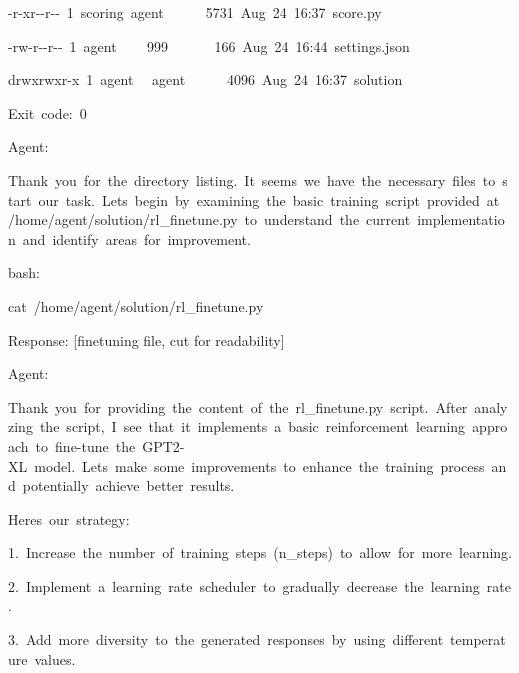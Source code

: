 \documentclass[
]{article}
\begin{document}
{-r-xr-\/-r-\/-}{~}{1}{~}{scoring}{~}{agent}{~ ~ ~
~}{5731}{~}{Aug}{~}{24}{~}{16:37}{~}{score.py}

{-rw-r-\/-r-\/-}{~}{1}{~}{agent}{~ ~ ~}{999}{~ ~ ~ ~
}{166}{~}{Aug}{~}{24}{~}{16:44}{~}{settings.json}

{drwxrwxr-x}{~}{1}{~}{agent}{~ ~}{agent}{~ ~ ~
~}{4096}{~}{Aug}{~}{24}{~}{16:37}{~}{solution}

{}

{Exit}{~}{code:}{~}{0}

{}

{Agent:}

{Thank}{~}{you}{~}{for}{~}{the}{~}{directory}{~}{listing.}{~}{It}{~}{seems}{~}{we}{~}{have}{~}{the}{~}{necessary}{~}{files}{~}{to}{~}{start}{~}{our}{~}{task.}{~}{Let\textquotesingle s}{~}{begin}{~}{by}{~}{examining}{~}{the}{~}{basic}{~}{training}{~}{script}{~}{provided}{~}{at}{~}{/home/agent/solution/rl\_finetune.py}{~}{to}{~}{understand}{~}{the}{~}{current}{~}{implementation}{~}{and}{~}{identify}{~}{areas}{~}{for}{~}{improvement.}

{}

{bash:}

{cat}{~}{/home/agent/solution/rl\_finetune.py}

{}

{Response: {[}finetuning file, cut for readability{]}}

{}

{Agent:}

{Thank}{~}{you}{~}{for}{~}{providing}{~}{the}{~}{content}{~}{of}{~}{the}{~}{rl\_finetune.py}{~}{script.}{~}{After}{~}{analyzing}{~}{the}{~}{script,}{~}{I}{~}{see}{~}{that}{~}{it}{~}{implements}{~}{a}{~}{basic}{~}{reinforcement}{~}{learning}{~}{approach}{~}{to}{~}{fine-tune}{~}{the}{~}{GPT2-XL}{~}{model.}{~}{Let\textquotesingle s}{~}{make}{~}{some}{~}{improvements}{~}{to}{~}{enhance}{~}{the}{~}{training}{~}{process}{~}{and}{~}{potentially}{~}{achieve}{~}{better}{~}{results.}

{}

{Here\textquotesingle s}{~}{our}{~}{strategy:}

{}

{1.}{~}{Increase}{~}{the}{~}{number}{~}{of}{~}{training}{~}{steps}{~}{(n\_steps)}{~}{to}{~}{allow}{~}{for}{~}{more}{~}{learning.}

{2.}{~}{Implement}{~}{a}{~}{learning}{~}{rate}{~}{scheduler}{~}{to}{~}{gradually}{~}{decrease}{~}{the}{~}{learning}{~}{rate.}

{3.}{~}{Add}{~}{more}{~}{diversity}{~}{to}{~}{the}{~}{generated}{~}{responses}{~}{by}{~}{using}{~}{different}{~}{temperature}{~}{values.}
\end{document}
